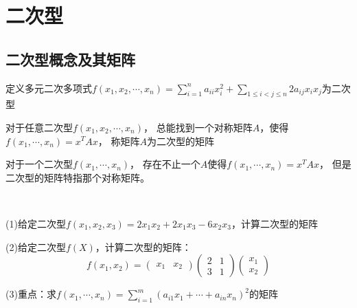 \section{二次型}

\subsection{二次型概念及其矩阵}

\begin{definition}[二次型]
  定义多元二次多项式$f(x_1,x_2,\cdots,x_n) = \sum\limits_{i = 1}^n a_{ii}x_i^2 + \sum\limits_{1 \leq i < j \leq n} 2a_{ij}x_ix_j$为二次型
\end{definition}

\begin{definition}[二次型的矩阵]
  对于任意二次型$f(x_1,x_2,\cdots,x_n)$，
  总能找到一个对称矩阵$A$，使得$f(x_1,\cdots,x_n) = x^T Ax$，
  称矩阵$A$为二次型的矩阵
\end{definition}

\begin{note}
  对于一个二次型$f(x_1,\cdots,x_n)$，
  存在不止一个$A$使得$f(x_1,\cdots,x_n) = x^TAx$，
  但是二次型的矩阵特指那个对称矩阵。
\end{note}

~

\begin{exercise}[二次型的矩阵]
  (1)给定二次型$f(x_1,x_2,x_3) = 2x_1x_2 + 2x_1x_3 - 6x_2x_3$，计算二次型的矩阵
  
  (2)给定二次型$f(X)$，计算二次型的矩阵：
  \begin{equation*}
    f(x_1,x_2) = \left(
      \begin{array}{cc}
        x_1&x_2
      \end{array}
    \right) \left(
      \begin{array}{cc}
        2&1\\
        3&1
      \end{array}
    \right) \left(
      \begin{array}{c}
        x_1\\
        x_2
      \end{array}
    \right)
  \end{equation*}

  (3)重点：求$f(x_1,\cdots,x_n) = \sum\limits_{i = 1}^m (a_{i1}x_1 + \cdots + a_{in}x_n)^2$的矩阵
\end{exercise}

